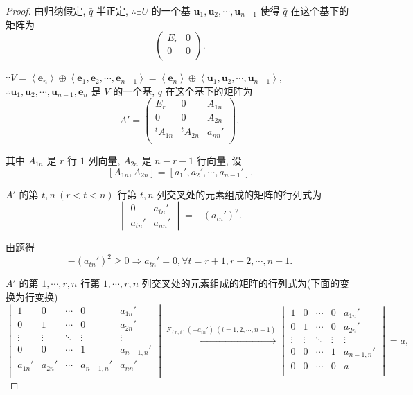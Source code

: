 \documentclass[color=black,device=normal,lang=cn,mode=geye]{elegantnote}
\begin{document}
\begin{proof}
    由归纳假定, $\bar{q}$ 半正定, $\therefore\exists U$ 的一个基 $\boldsymbol{u}_1,\boldsymbol{u}_2,\cdots,\boldsymbol{u}_{n-1}$ 使得 $\bar{q}$ 在这个基下的矩阵为
    \[\begin{pmatrix}
        E_r & 0 \\
        0 & 0 \\
    \end{pmatrix}.\]

    $\because V=\left<\boldsymbol{e}_n\right>\oplus\left<\boldsymbol{e}_1,\boldsymbol{e}_2,\cdots,\boldsymbol{e}_{n-1}\right>=\left<\boldsymbol{e}_n\right>\oplus\left<\boldsymbol{u}_1,\boldsymbol{u}_2,\cdots,\boldsymbol{u}_{n-1}\right>$, $\therefore\boldsymbol{u}_1,\boldsymbol{u}_2,\cdots,\boldsymbol{u}_{n-1},\boldsymbol{e}_n$ 是 $V$ 的一个基, $q$ 在这个基下的矩阵为
    \[A'=\begin{pmatrix}
        E_r & 0 & A_{1n} \\
        0 & 0 & A_{2n} \\
        {}^tA_{1n} & {}^tA_{2n} & a_{nn}' \\
    \end{pmatrix},\]

    其中 $A_{1n}$ 是 $r$ 行 $1$ 列向量, $A_{2n}$ 是 $n-r-1$ 行向量, 设
    \[[A_{1n},A_{2n}]=[a_1',a_2',\cdots,a_{n-1}'].\]

    $A'$ 的第 $t,n\ (r<t<n)$ 行第 $t,n$ 列交叉处的元素组成的矩阵的行列式为
    \[\begin{vmatrix}
        0 & a_{tn}' \\
        a_{tn}' & a_{nn}'
    \end{vmatrix}=-(a_{tn}')^2.\]

    由题得
    \begin{equation}\label{eq4.7}
        -(a_{tn}')^2\geq0\Rightarrow a_{tn}'=0,\forall t=r+1,r+2,\cdots,n-1.
    \end{equation}

    $A'$ 的第 $1,\cdots,r,n$ 行第 $1,\cdots,r,n$ 列交叉处的元素组成的矩阵的行列式为(下面的变换为行变换)
    \[\begin{vmatrix}
        1 & 0 & \cdots & 0 & a_{1n}' \\
        0 & 1 & \cdots & 0 & a_{2n}' \\
        \vdots & \vdots & \ddots & \vdots & \vdots \\
        0 & 0 & \cdots & 1 & a_{n-1,n}' \\
        a_{1n}' & a_{2n}' & \cdots & a_{n-1,n}' & a_{nn}' \\
    \end{vmatrix}\xrightarrow{F_{(n,i)}(-a_{in}')\ (i=1,2,\cdots,n-1)}\begin{vmatrix}
        1 & 0 & \cdots & 0 & a_{1n}' \\
        0 & 1 & \cdots & 0 & a_{2n}' \\
        \vdots & \vdots & \ddots & \vdots & \vdots \\
        0 & 0 & \cdots & 1 & a_{n-1,n}' \\
        0 & 0 & \cdots & 0 & a \\
    \end{vmatrix}=a,\]


\end{proof}
\end{document}
